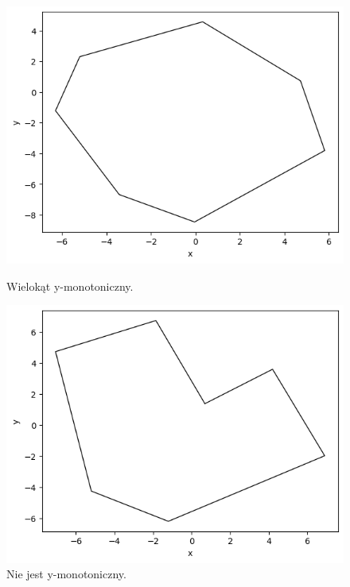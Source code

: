 \documentclass[11pt]{scrartcl}
\begin{document}
    \begin{figure}[H]
        \centering
        \begin{minipage}{0.45\linewidth}
          \centering
          \includegraphics[width=1\linewidth]{3_1.png}
          \caption{Wielokąt y-monotoniczny.}
        \end{minipage}
        \begin{minipage}{0.45\linewidth}
          \centering
          \includegraphics[width=1\linewidth]{3_2.png}
          \caption{Nie jest y-monotoniczny.}
        \end{minipage}
    \end{figure}
\end{document}
